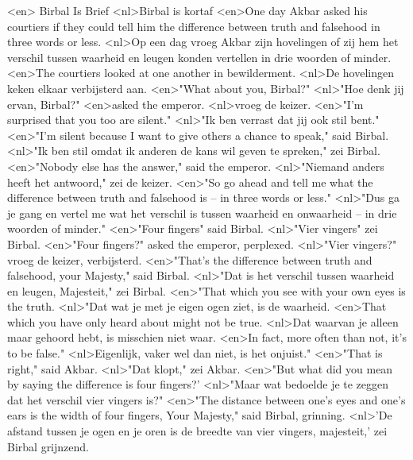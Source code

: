 <en> Birbal Is Brief
<nl>Birbal is kortaf
<en>One day Akbar asked his courtiers if they could tell him the difference between truth and falsehood in three words or less.
<nl>Op een dag vroeg Akbar zijn hovelingen of zij hem het verschil tussen waarheid en leugen konden vertellen in drie woorden of minder.
<en>The courtiers looked at one another in bewilderment.
<nl>De hovelingen keken elkaar verbijsterd aan.
<en>"What about you, Birbal?"
<nl>"Hoe denk jij ervan, Birbal?"
<en>asked the emperor.
<nl>vroeg de keizer.
<en>"I'm surprised that you too are silent."
<nl>"Ik ben verrast dat jij ook stil bent."
<en>"I'm silent because I want to give others a chance to speak," said Birbal.
<nl>"Ik ben stil omdat ik anderen de kans wil geven te spreken," zei Birbal.
<en>"Nobody else has the answer," said the emperor.
<nl>"Niemand anders heeft het antwoord," zei de keizer.
<en>"So go ahead and tell me what the difference between truth and falsehood is -- in three words or less."
<nl>"Dus ga je gang en vertel me wat het verschil is tussen waarheid en onwaarheid -- in drie woorden of minder."
<en>"Four fingers" said Birbal.
<nl>"Vier vingers" zei Birbal.
<en>"Four fingers?" asked the emperor, perplexed.
<nl>"Vier vingers?" vroeg de keizer, verbijsterd.
<en>"That's the difference between truth and falsehood, your Majesty," said Birbal.
<nl>"Dat is het verschil tussen waarheid en leugen, Majesteit," zei Birbal.
<en>"That which you see with your own eyes is the truth.
<nl>"Dat wat je met je eigen ogen ziet, is de waarheid.
<en>That which you have only heard about might not be true.
<nl>Dat waarvan je alleen maar gehoord hebt, is misschien niet waar.
<en>In fact, more often than not, it's to be false."
<nl>Eigenlijk, vaker wel dan niet, is het onjuist."
<en>"That is right," said Akbar.
<nl>"Dat klopt," zei Akbar.
<en>"But what did you mean by saying the difference is four fingers?'
<nl>"Maar wat bedoelde je te zeggen dat het verschil vier vingers is?"
<en>"The distance between one's eyes and one's ears is the width of four fingers, Your Majesty," said Birbal, grinning.
<nl>'De afstand tussen je ogen en je oren is de breedte van vier vingers, majesteit,' zei Birbal grijnzend.

